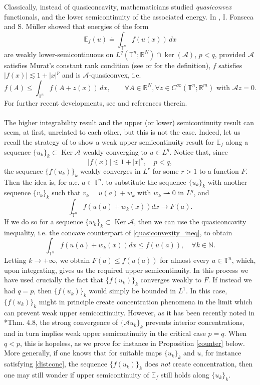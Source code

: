 \documentclass[10pt,reqno]{amsart}
\numberwithin{equation}{section}
\newcommand{\A}{\mathcal{A}}
\newcommand{\R}{\mathbb{R}}
\newcommand{\T}{\mathbb{T}}
\newcommand{\E}{\mathds{E}}
\newcommand{\N}{\mathbb{N}}
\DeclareMathOperator{\Ker}{Ker}
\theoremstyle{plain}
\theoremstyle{definition}
\theoremstyle{remark}
\begin{document}
 Classically, instead of quasiconcavity, mathematicians studied \emph{quasiconvex} functionals, and the lower semicontinuity of the associated energy. In \cite{FM}, I. Fonseca and S. M{\"u}ller showed that energies of the form
\begin{equation}\label{energy}
\E_f(u) \doteq \int_{\T^n}f(u(x))\,dx
\end{equation} 
are weakly lower-semicontinuous on $L^q(\T^n;\R^N)\cap\ker(\mathcal{A})$, $p<q$, provided $\mathcal{A}$ satisfies Murat's constant rank condition (see \cite{FM} or \cite{MURCOM} for the definition), $f$ satisfies $|f(x)| \lesssim 1 + |x|^p$ and is $\mathcal{A}$-quasiconvex, i.e.
\begin{equation}\label{quasiconvexity_ineq}
f(A) \le \int_{\T^n}f(A + z(x))\,dx, \qquad \forall A \in \R^{N}, \forall z \in C^\infty(\T^n;\R^m) \text{ with } \mathcal{A}z = 0.
\end{equation}
For further recent developments, see \cite{AB,KR,DM,REL,WIE,GR} and references therein.
\\
\\
The higher integrability result and the upper (or lower) semicontinuity result can seem, at first, unrelated to each other, but this is not the case. Indeed, let us recall the strategy of \cite{FM} to show a weak upper semicontinuity result for $\E_f$ along a sequence $\{u_k\}_k \subset \Ker\A$ weakly converging to $u \in L^q$. Notice that, since
\[
|f(x)| \lesssim 1 + |x|^p, \quad p<q,
\] 
the sequence $\{f(u_k)\}_k$ weakly converges in $L^r$ for some $r > 1$ to a function $F$. Then the idea is, for a.e. $a \in \T^n$, to substitute the sequence $\{u_k\}_k$ with another sequence $\{v_k\}_k$ such that $v_k = u(a) + w_k$ with $w_k \rightharpoonup 0$ in $L^q$, and
\[
\int_{\T^n}f(u(a) + w_k(x))dx \to F(a).
\]
If we do so for a sequence $\{w_k\}_k\subset \Ker \mathcal{A}$, then we can use the quasiconcavity inequality, i.e. the concave counterpart of \eqref{quasiconvexity_ineq}, to obtain
\[
\int_{\T^n}f(u(a) + w_k(x))dx \le f(u(a)), \quad \forall k \in \N.
\]
Letting $k \to +\infty$, we obtain $F(a) \le f(u(a))$ for almost every $a\in\T^n$, which, upon integrating, gives us the required upper semicontinuity. In this process we have used crucially the fact that $\{f(u_k)\}_k$ converges weakly to $F$. If instead we had $q =p$, then $\{f(u_k)\}_k$ would simply be bounded in $L^1$. In this case, $\{f(u_k)\}_k$ might in principle create concentration phenomena in the limit which can prevent weak upper semicontinuity. However, as it has been recently noted in \cite{GR2}*{Thm.  4.8}, the strong convergence of $\{\mathcal{A}u_k\}_k$ prevents interior concentrations, and in turn implies weak upper semicontinuity in the critical case $p=q$. When $q<p$, this is hopeless, as we prove for instance in Proposition \ref{counter} below. More generally, if one knows that for suitable maps $\{u_k\}_k$ and $u$, for instance satisfying \eqref{distcone}, the sequence $\{f(u_k)\}_k$ does \emph{not} create concentration, then one may still wonder if upper semicontinuity of $\E_f$ still holds along $\{u_k\}_k$.
\end{document}
